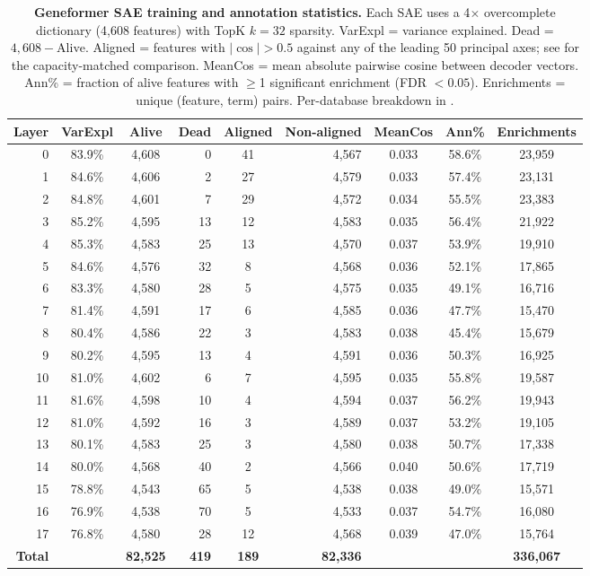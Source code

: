 \documentclass[onecolumn,11pt]{article}
\begin{document}
\begin{table}[t]
\centering
\caption{\textbf{Geneformer SAE training and annotation statistics.} Each SAE uses a 4$\times$ overcomplete dictionary (4,608 features) with TopK $k{=}32$ sparsity. VarExpl = variance explained. Dead = $4{,}608 - \text{Alive}$. Aligned = features with $|\cos| > 0.5$ against any of the leading 50 principal axes; see  for the capacity-matched comparison. MeanCos = mean absolute pairwise cosine between decoder vectors. Ann\% = fraction of alive features with $\geq$1 significant enrichment (FDR $< 0.05$). Enrichments = unique (feature, term) pairs. Per-database breakdown in .}
\label{tab:full18}
\smallskip
\begin{tabular}{rccrcrccc}
\toprule
Layer & VarExpl & Alive & Dead & Aligned & Non-aligned & MeanCos & Ann\% & Enrichments \\
\midrule
0  & 83.9\% & 4,608 & 0   & 41 & 4,567 & 0.033 & 58.6\% & 23,959 \\
1  & 84.6\% & 4,606 & 2   & 27 & 4,579 & 0.033 & 57.4\% & 23,131 \\
2  & 84.8\% & 4,601 & 7   & 29 & 4,572 & 0.034 & 55.5\% & 23,383 \\
3  & 85.2\% & 4,595 & 13  & 12 & 4,583 & 0.035 & 56.4\% & 21,922 \\
4  & 85.3\% & 4,583 & 25  & 13 & 4,570 & 0.037 & 53.9\% & 19,910 \\
5  & 84.6\% & 4,576 & 32  & 8  & 4,568 & 0.036 & 52.1\% & 17,865 \\
6  & 83.3\% & 4,580 & 28  & 5  & 4,575 & 0.035 & 49.1\% & 16,716 \\
7  & 81.4\% & 4,591 & 17  & 6  & 4,585 & 0.036 & 47.7\% & 15,470 \\
8  & 80.4\% & 4,586 & 22  & 3  & 4,583 & 0.038 & 45.4\% & 15,679 \\
9  & 80.2\% & 4,595 & 13  & 4  & 4,591 & 0.036 & 50.3\% & 16,925 \\
10 & 81.0\% & 4,602 & 6   & 7  & 4,595 & 0.035 & 55.8\% & 19,587 \\
11 & 81.6\% & 4,598 & 10  & 4  & 4,594 & 0.037 & 56.2\% & 19,943 \\
12 & 81.0\% & 4,592 & 16  & 3  & 4,589 & 0.037 & 53.2\% & 19,105 \\
13 & 80.1\% & 4,583 & 25  & 3  & 4,580 & 0.038 & 50.7\% & 17,338 \\
14 & 80.0\% & 4,568 & 40  & 2  & 4,566 & 0.040 & 50.6\% & 17,719 \\
15 & 78.8\% & 4,543 & 65  & 5  & 4,538 & 0.038 & 49.0\% & 15,571 \\
16 & 76.9\% & 4,538 & 70  & 5  & 4,533 & 0.037 & 54.7\% & 16,080 \\
17 & 76.8\% & 4,580 & 28  & 12 & 4,568 & 0.039 & 47.0\% & 15,764 \\
\midrule
\textbf{Total} & & \textbf{82,525} & \textbf{419} & \textbf{189} & \textbf{82,336} & & & \textbf{336,067} \\
\bottomrule
\end{tabular}
\end{table}
\end{document}
